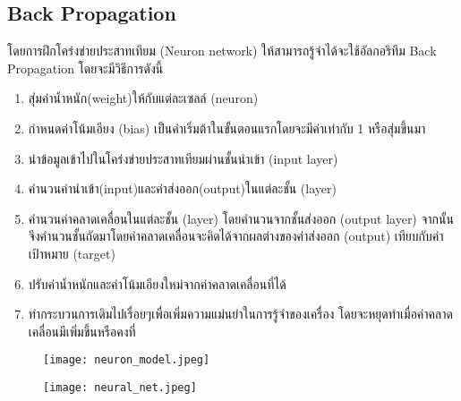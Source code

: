        \subsection{Back Propagation}
        โดยการฝึกโคร่งข่ายประสาทเทียม (Neuron network) ให้สามารถรู้จำได้จะใช้อัลกอริทึม
        Back Propagation โดยจะมีวิธีการดังนี้ 
        \begin{enumerate}[label=2.1.\arabic*]
      \item{สุ่มค่าน้ำหนัก(weight)}ให้กับแต่ละเซลล์ (neuron)
      \item{กำหนดค่าโน้มเอียง (bias) }เป็นค่าเริ่มต้าในขั้นตอนแรกโดยจะมีค่าเท่ากับ 1 หรือสุ่มขึ้นมา
      \item{นำข้อมูลเข้าไปในโคร่งข่ายประสาทเทียมผ่านชั้นนำเข้า (input layer) }
      \item{คำนวนค่านำเข้า(input)และค่าส่งออก(output)ในแต่ละชั้น (layer) }
      \item{คำนวนค่าคลาดเคลื่อนในแต่ละชั้น (layer) }โดยคำนวนจากชั้นส่งออก (output layer) จากนั้นจึงคำนวนชั้นถัดมาโดยค่าคลาดเคลื่อนจะคิดได้จากผลต่างของค่าส่งออก (output) เทียบกับค่าเป้าหมาย (target)
      \item{ปรับค่าน้ำหนักและค่าโน้มเอียงใหม่จากค่าคลาดเคลื่อนที่ได้}
      \item{ทำกระบวนการเดิมไปเรื่อยๆเพื่อเพิ่มความแม่นยำในการรู้จำของเครื่อง} โดยจะหยุดทำเมื่อค่าคลาดเคลื่อนมีเพิ่มขึ้นหรือคงที่
        \end{enumerate} 
\begin{center}
  \begin{figure}[t]
   \captionsetup{justification=centering}
    \centering
    \texttt{[image: neuron\_model.jpeg]}
  \label{fig:neuron}
  \hrulefill
\end{figure}
 \end{center}
  \begin{center}
  \begin{figure}[t]
    \captionsetup{justification=centering}
    \centering
    \texttt{[image: neural\_net.jpeg]}
  \label{fig:neuron-network}
  \hrulefill
\end{figure}
  \end{center}
